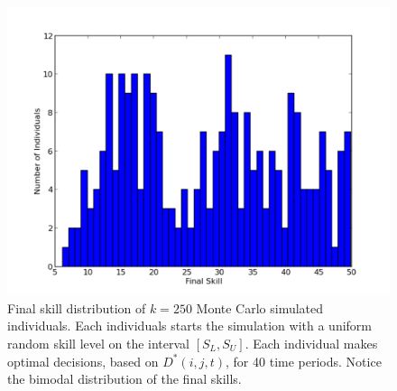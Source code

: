 \documentclass[12pt, letterpaper, fleqn]{article}
\begin{document}
	\clearpage
	\begin{figure}[h!]
	\caption{Final skill distribution of $k=250$ Monte Carlo simulated individuals. Each individuals starts the simulation with a uniform random skill level on the interval $[S_L,S_U]$. Each individual makes optimal decisions, based on $D^*(i,j,t)$, for 40 time periods. Notice the bimodal distribution of the final skills. }
	\begin{center}
	\centerline{\includegraphics[width=160mm]{Fmcmc.pdf}}
	\end{center}
	\label{Fmcmc}
	\end{figure}
\end{document}
